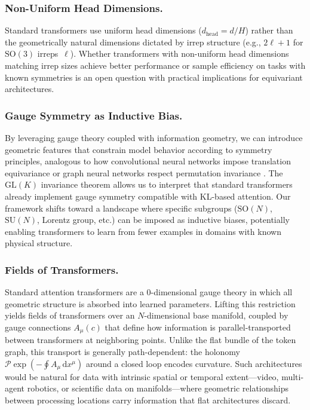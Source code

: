 \documentclass[twoside,11pt]{article}
\begin{document}
\subsubsection{Non-Uniform Head Dimensions.}

Standard transformers use uniform head dimensions ($d_{\mathrm{head}} = d/H$) rather than the geometrically natural dimensions dictated by irrep structure (e.g., $2\ell + 1$ for $\mathrm{SO}(3)$ irreps~$\ell$). Whether transformers with non-uniform head dimensions matching irrep sizes achieve better performance or sample efficiency on tasks with known symmetries is an open question with practical implications for equivariant architectures.

\subsubsection{Gauge Symmetry as Inductive Bias.}

By leveraging gauge theory coupled with information geometry, we can introduce geometric features that constrain model behavior according to symmetry principles, analogous to how convolutional neural networks impose translation equivariance or graph neural networks respect permutation invariance \citep{finzi2020generalizing,weiler20183d,kondor2018generalization}. The $\mathrm{GL}(K)$ invariance theorem allows us to interpret that standard transformers already implement gauge symmetry compatible with KL-based attention. Our framework shifts toward a landscape where specific subgroups ($\mathrm{SO}(N)$, $\mathrm{SU}(N)$, Lorentz group, etc.) can be imposed as inductive biases, potentially enabling transformers to learn from fewer examples in domains with known physical structure.

\subsubsection{Fields of Transformers.}

Standard attention transformers are a 0-dimensional gauge theory in which all geometric structure is absorbed into learned parameters. Lifting this restriction yields fields of transformers over an $N$-dimensional base manifold, coupled by gauge connections $A_\mu(c)$ that define how information is parallel-transported between transformers at neighboring points. Unlike the flat bundle of the token graph, this transport is generally path-dependent: the holonomy $\mathcal{P}\exp\!\left(-\oint A_\mu \, \mathrm{d}x^\mu\right)$ around a closed loop encodes curvature. Such architectures would be natural for data with intrinsic spatial or temporal extent---video, multi-agent robotics, or scientific data on manifolds---where geometric relationships between processing locations carry information that flat architectures discard.
\end{document}
